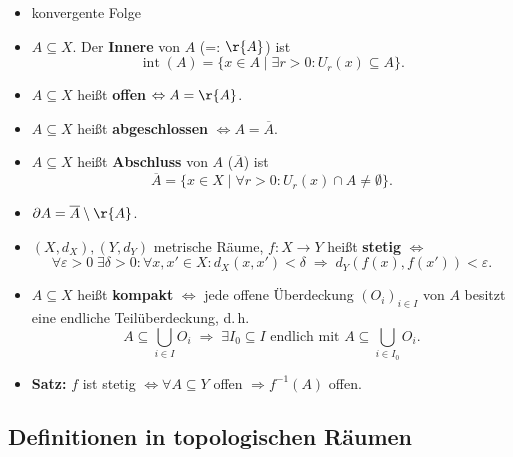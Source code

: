 \begin{itemize}
  \item konvergente Folge

  \item $A \subseteq X$.  
  Der \textbf{Innere} von $A$ (=: $\r{A} $) ist
  \begin{equation*}
    \operatorname{int}(A) = \{ x \in A \mid \exists r > 0 : U_r(x) \subseteq A \}.
  \end{equation*}

  \item $A \subseteq X$ heißt \textbf{offen} $\Leftrightarrow A = \r{A}$.

  \item $A \subseteq X$ heißt \textbf{abgeschlossen} $\Leftrightarrow A = \overline{A}$.

  \item $A \subseteq X$ heißt \textbf{Abschluss} von $A$ ($\overline{A}$) ist
  \begin{equation*}
    \overline{A} = \{ x \in X \mid \forall r > 0 : U_r(x) \cap A \neq \emptyset \}.
  \end{equation*}

  \item $\partial A = \overline{A} \setminus \r{A}$.

  \item $(X, d_X), (Y, d_Y)$ metrische Räume, $f : X \to Y$ heißt \textbf{stetig} $\Leftrightarrow$
  \begin{equation*}
    \forall \varepsilon > 0 \; \exists \delta > 0 : 
    \forall x, x' \in X :
    d_X(x, x') < \delta \;\Rightarrow\; d_Y(f(x), f(x')) < \varepsilon.
  \end{equation*}

  \item $A \subseteq X$ heißt \textbf{kompakt} $\Leftrightarrow$ 
  jede offene Überdeckung $(O_i)_{i \in I}$ von $A$ besitzt eine endliche Teilüberdeckung, d.\,h.
  \begin{equation*}
    A \subseteq \bigcup_{i \in I} O_i 
    \;\Rightarrow\;
    \exists I_0 \subseteq I \text{ endlich mit } A \subseteq \bigcup_{i \in I_0} O_i.
  \end{equation*}

  \item \textbf{Satz:}  
  $f$ ist stetig $\Leftrightarrow \forall A \subseteq Y$ offen $\Rightarrow f^{-1}(A)$ offen.
\end{itemize}

\subsection{Definitionen in topologischen Räumen}

